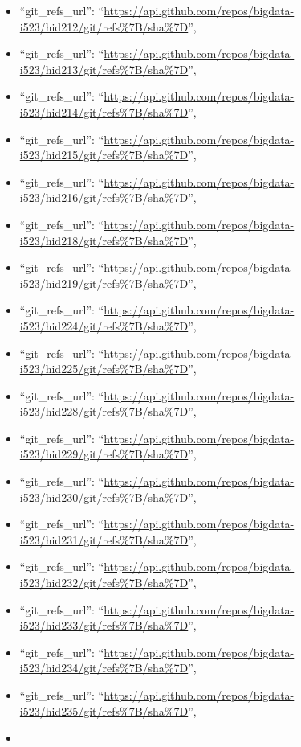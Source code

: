 \begin{itemize}
\item
  ``git\_refs\_url'':
  ``\url{https://api.github.com/repos/bigdata-i523/hid212/git/refs\%7B/sha\%7D}'',
\item
  ``git\_refs\_url'':
  ``\url{https://api.github.com/repos/bigdata-i523/hid213/git/refs\%7B/sha\%7D}'',
\item
  ``git\_refs\_url'':
  ``\url{https://api.github.com/repos/bigdata-i523/hid214/git/refs\%7B/sha\%7D}'',
\item
  ``git\_refs\_url'':
  ``\url{https://api.github.com/repos/bigdata-i523/hid215/git/refs\%7B/sha\%7D}'',
\item
  ``git\_refs\_url'':
  ``\url{https://api.github.com/repos/bigdata-i523/hid216/git/refs\%7B/sha\%7D}'',
\item
  ``git\_refs\_url'':
  ``\url{https://api.github.com/repos/bigdata-i523/hid218/git/refs\%7B/sha\%7D}'',
\item
  ``git\_refs\_url'':
  ``\url{https://api.github.com/repos/bigdata-i523/hid219/git/refs\%7B/sha\%7D}'',
\item
  ``git\_refs\_url'':
  ``\url{https://api.github.com/repos/bigdata-i523/hid224/git/refs\%7B/sha\%7D}'',
\item
  ``git\_refs\_url'':
  ``\url{https://api.github.com/repos/bigdata-i523/hid225/git/refs\%7B/sha\%7D}'',
\item
  ``git\_refs\_url'':
  ``\url{https://api.github.com/repos/bigdata-i523/hid228/git/refs\%7B/sha\%7D}'',
\item
  ``git\_refs\_url'':
  ``\url{https://api.github.com/repos/bigdata-i523/hid229/git/refs\%7B/sha\%7D}'',
\item
  ``git\_refs\_url'':
  ``\url{https://api.github.com/repos/bigdata-i523/hid230/git/refs\%7B/sha\%7D}'',
\item
  ``git\_refs\_url'':
  ``\url{https://api.github.com/repos/bigdata-i523/hid231/git/refs\%7B/sha\%7D}'',
\item
  ``git\_refs\_url'':
  ``\url{https://api.github.com/repos/bigdata-i523/hid232/git/refs\%7B/sha\%7D}'',
\item
  ``git\_refs\_url'':
  ``\url{https://api.github.com/repos/bigdata-i523/hid233/git/refs\%7B/sha\%7D}'',
\item
  ``git\_refs\_url'':
  ``\url{https://api.github.com/repos/bigdata-i523/hid234/git/refs\%7B/sha\%7D}'',
\item
  ``git\_refs\_url'':
  ``\url{https://api.github.com/repos/bigdata-i523/hid235/git/refs\%7B/sha\%7D}'',
\item

\end{itemize}
